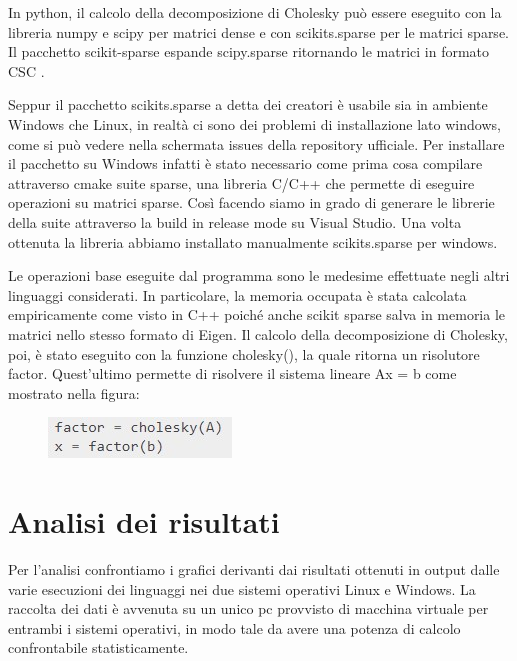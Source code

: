 \documentclass[a4paper,10pt]{article}
\begin{document}
In python, il calcolo della decomposizione di Cholesky può essere eseguito con la libreria numpy e scipy per matrici dense e con scikits.sparse per le matrici sparse. Il pacchetto scikit-sparse espande scipy.sparse ritornando le matrici in formato CSC . 

Seppur il pacchetto scikits.sparse a detta dei creatori è usabile sia in ambiente Windows che Linux, in realtà ci sono dei problemi di installazione lato windows, come si può vedere nella schermata issues della repository ufficiale. Per installare il pacchetto su Windows infatti è stato necessario come prima cosa compilare attraverso cmake suite sparse, una libreria C/C++ che permette di eseguire operazioni su matrici sparse. Così facendo siamo in grado di generare le librerie della suite attraverso la build in release mode su Visual Studio. Una volta ottenuta la libreria abbiamo installato manualmente scikits.sparse per windows. 

Le operazioni base eseguite dal programma sono le medesime effettuate negli altri linguaggi considerati. In particolare, la memoria occupata è stata calcolata empiricamente come visto in C++ poiché anche scikit sparse salva in memoria le matrici nello stesso formato di Eigen. Il calcolo della decomposizione di Cholesky, poi, è stato eseguito con la funzione cholesky(), la quale ritorna un risolutore factor. Quest’ultimo permette di risolvere il sistema lineare Ax = b come mostrato nella figura:

\begin{figure}[H]
\centering
\includegraphics[width=0.4\linewidth]{img/python1.jpg}
\end{figure}

\newpage

\section{Analisi dei risultati}
Per l’analisi confrontiamo i grafici derivanti dai risultati ottenuti in output dalle varie esecuzioni dei linguaggi nei due sistemi operativi Linux e Windows. 
La raccolta dei dati è avvenuta su un unico pc provvisto di macchina virtuale per entrambi i sistemi operativi, in modo tale da avere una potenza di calcolo confrontabile statisticamente.
\end{document}
